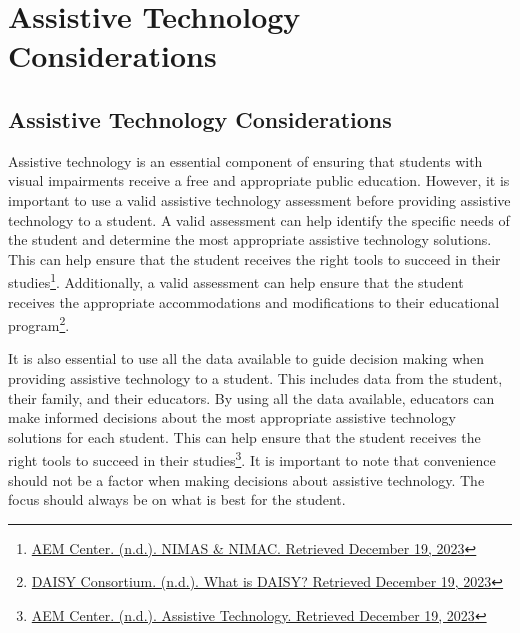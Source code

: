 \hypertarget{trouble3}{}\chapter[\hfill\break\raggedright Assistive Technology Considerations]{Assistive Technology Considerations}\label{trouble3}
\noindent\makebox[\linewidth]{\rule{\linewidth}{0.4pt}}
{\let\clearpage\relax\localtableofcontents}\newpage
\hypertarget{trouble5}{}\section[Assistive Technology Considerations]{Assistive Technology Considerations}\label{trouble5}
Assistive technology is an essential component of ensuring that students with visual impairments receive a free and appropriate public education. However, it is important to use a valid assistive technology assessment before providing assistive technology to a student. A valid assessment can help identify the specific needs of the student and determine the most appropriate assistive technology solutions. This can help ensure that the student receives the right tools to succeed in their studies\footnote{\raggedright \href{https://aem.cast.org/nimas-nimac/nimas-nimac}{AEM Center. (n.d.). NIMAS \& NIMAC. Retrieved December 19, 2023}}. Additionally, a valid assessment can help ensure that the student receives the appropriate accommodations and modifications to their educational program\footnote{\raggedright \href{https://daisy.org/about\_us/what-is-daisy/ }{DAISY Consortium. (n.d.). What is DAISY? Retrieved December 19, 2023}}.

It is also essential to use all the data available to guide decision making when providing assistive technology to a student. This includes data from the student, their family, and their educators. By using all the data available, educators can make informed decisions about the most appropriate assistive technology solutions for each student. This can help ensure that the student receives the right tools to succeed in their studies\footnote{\raggedright \href{https://aem.cast.org/learn/assistive-technology}{AEM Center. (n.d.). Assistive Technology. Retrieved December 19, 2023}}. It is important to note that convenience should not be a factor when making decisions about assistive technology. The focus should always be on what is best for the student.

